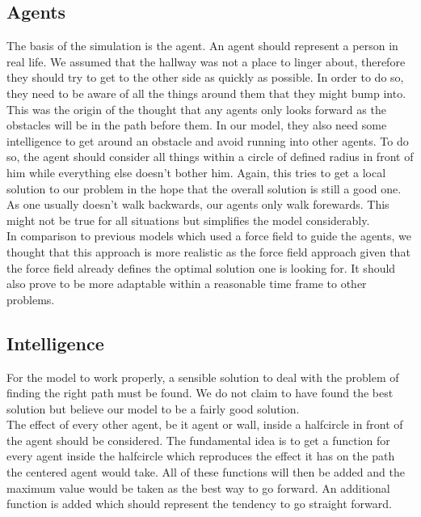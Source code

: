 \subsection{Agents}
The basis of the simulation is the agent. An agent should represent a person in real life. We assumed that the hallway was not a place to linger about, therefore they should try to get to the other side as quickly as possible. In order to do so, they need to be aware of all the things around them that they might bump into. This was the origin of the thought that any agents only looks forward as the obstacles will be in the path before them. In our model, they also need some intelligence to get around an obstacle and avoid running into other agents. To do so, the agent should consider all things within a circle of defined radius in front of him while everything else doesn't bother him. Again, this tries to get a local solution to our problem in the hope that the overall solution is still a good one. As one usually doesn't walk backwards, our agents only walk forewards. This might not be true for all situations but simplifies the model considerably.\\

\noi In comparison to previous models which used a force field to guide the agents, we thought that this approach is more realistic as the force field approach given that the force field already defines the optimal solution one is looking for. It should also prove to be more adaptable within a reasonable time frame to other problems.

\subsection{Intelligence}
For the model to work properly, a sensible solution to deal with the problem of finding the right path must be found. We do not claim to have found the best solution but believe our model to be a fairly good solution.\\
The effect of every other agent, be it agent or wall, inside a halfcircle in front of the agent should be considered. The fundamental idea is to get a function for every agent inside the halfcircle which reproduces the effect it has on the path the centered agent would take. All of these functions will then be added and the maximum value would be taken as the best way to go forward. An additional function is added which should represent the tendency to go straight forward.\\

